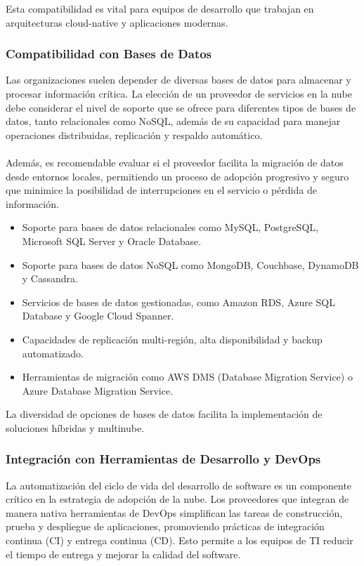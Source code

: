 {                Esta compatibilidad es vital para equipos de desarrollo que trabajan en arquitecturas cloud-native y aplicaciones modernas.
                
            \subsubsection{Compatibilidad con Bases de Datos}
                Las organizaciones suelen depender de diversas bases de datos para almacenar y procesar información crítica. La elección de un proveedor de servicios en la nube debe considerar el nivel de soporte que se ofrece para diferentes tipos de bases de datos, tanto relacionales como NoSQL, además de su capacidad para manejar operaciones distribuidas, replicación y respaldo automático.

                \paragraph{}Además, es recomendable evaluar si el proveedor facilita la migración de datos desde entornos locales, permitiendo un proceso de adopción progresivo y seguro que minimice la posibilidad de interrupciones en el servicio o pérdida de información.

                \begin{itemize}
                    \item Soporte para bases de datos relacionales como MySQL, PostgreSQL, Microsoft SQL Server y Oracle Database.
                    \item Soporte para bases de datos NoSQL como MongoDB, Couchbase, DynamoDB y Cassandra.
                    \item Servicios de bases de datos gestionadas, como Amazon RDS, Azure SQL Database y Google Cloud Spanner.
                    \item Capacidades de replicación multi-región, alta disponibilidad y backup automatizado.
                    \item Herramientas de migración como AWS DMS (Database Migration Service) o Azure Database Migration Service.
                \end{itemize}
                
                La diversidad de opciones de bases de datos facilita la implementación de soluciones híbridas y multinube.
                
            \subsubsection{Integración con Herramientas de Desarrollo y DevOps}
                La automatización del ciclo de vida del desarrollo de software es un componente crítico en la estrategia de adopción de la nube. Los proveedores que integran de manera nativa herramientas de DevOps simplifican las tareas de construcción, prueba y despliegue de aplicaciones, promoviendo prácticas de integración continua (CI) y entrega continua (CD). Esto permite a los equipos de TI reducir el tiempo de entrega y mejorar la calidad del software.
                
}
